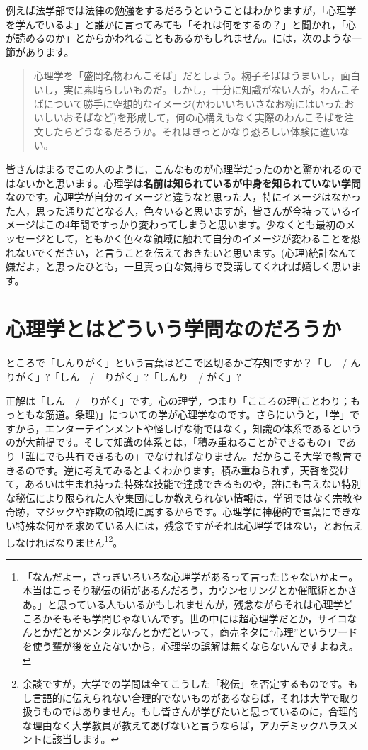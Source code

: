 \documentclass{ltjsbook}
\begin{document}
例えば法学部では法律の勉強をするだろうということはわかりますが，「心理学を学んでいるよ」と誰かに言ってみても「それは何をするの？」と聞かれ，「心が読めるのか」とからかわれることもあるかもしれません。\citet{道又200903}には，次のような一節があります。

\begin{quote}
    心理学を「盛岡名物わんこそば」だとしよう。椀子そばはうまいし，面白いし，実に素晴らしいものだ。しかし，十分に知識がない人が，わんこそばについて勝手に空想的なイメージ(かわいいちいさなお椀にはいったおいしいおそばなど)を形成して，何の心構えもなく実際のわんこそばを注文したらどうなるだろうか。それはきっとかなり恐ろしい体験に違いない。
\end{quote}

皆さんはまるでこの人のように，こんなものが心理学だったのかと驚かれるのではないかと思います。心理学は\textbf{名前は知られているが中身を知られていない学問}なのです。心理学が自分のイメージと違うなと思った人，特にイメージはなかった人，思った通りだとなる人，色々いると思いますが，皆さんが今持っているイメージはこの4年間ですっかり変わってしまうと思います。少なくとも最初のメッセージとして，ともかく色々な領域に触れて自分のイメージが変わることを恐れないでください，と言うことを伝えておきたいと思います。(心理)統計なんて嫌だよ，と思ったひとも，一旦真っ白な気持ちで受講してくれれば嬉しく思います。

\section{心理学とはどういう学問なのだろうか} 

ところで「しんりがく」という言葉はどこで区切るかご存知ですか？「し　/ んりがく」?「しん　/　りがく」?「しんり　/ がく」?

正解は「しん　/　りがく」です。心の理学，つまり「こころの理(ことわり；もっともな筋道。条理)」についての学が心理学なのです。さらにいうと，「学」ですから，エンターテインメントや怪しげな術ではなく，知識の体系であるというのが大前提です。そして知識の体系とは，「積み重ねることができるもの」であり「誰にでも共有できるもの」でなければなりません。だからこそ大学で教育できるのです。逆に考えてみるとよくわかります。積み重ねられず，天啓を受けて，あるいは生まれ持った特殊な技能で達成できるものや，誰にも言えない特別な秘伝により限られた人や集団にしか教えられない情報は，学問ではなく宗教や奇跡，マジックや詐欺の領域に属するからです。心理学に神秘的で言葉にできない特殊な何かを求めている人には，残念ですがそれは心理学ではない，とお伝えしなければなりません\footnote{「なんだよー，さっきいろいろな心理学があるって言ったじゃないかよー。本当はこっそり秘伝の術があるんだろう，カウンセリングとか催眠術とかさあ。」と思っている人もいるかもしれませんが，残念ながらそれは心理学どころかそもそも学問じゃないんです。世の中には超心理学だとか，サイコなんとかだとかメンタルなんとかだといって，商売ネタに``心理''というワードを使う輩が後を立たないから，心理学の誤解は無くならないんですよねえ。}\footnote{余談ですが，大学での学問は全てこうした「秘伝」を否定するものです。もし言語的に伝えられない合理的でないものがあるならば，それは大学で取り扱うものではありません。もし皆さんが学びたいと思っているのに，合理的な理由なく大学教員が教えてあげないと言うならば，アカデミックハラスメントに該当します。}。
\end{document}
